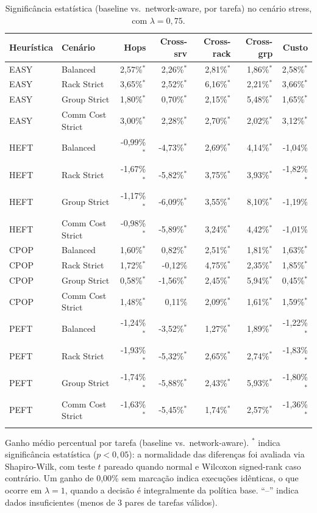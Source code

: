 \begin{table}[htbp]
\centering
\small
\caption{Significância estatística (baseline vs.\ network-aware, por tarefa) no cenário stress, com $\lambda = 0{,}75$.}
\label{tab:significancia_stress_lambda_075}
\begin{tabular}{llrrrrr}
\toprule
Heurística & Cenário & Hops & Cross-srv & Cross-rack & Cross-grp & Custo \\
\midrule
EASY & Balanced & 2,57\%$^{*}$ & 2,26\%$^{*}$ & 2,81\%$^{*}$ & 1,86\%$^{*}$ & 2,58\%$^{*}$ \\
EASY & Rack Strict & 3,65\%$^{*}$ & 2,52\%$^{*}$ & 6,16\%$^{*}$ & 2,21\%$^{*}$ & 3,66\%$^{*}$ \\
EASY & Group Strict & 1,80\%$^{*}$ & 0,70\%$^{*}$ & 2,15\%$^{*}$ & 5,48\%$^{*}$ & 1,65\%$^{*}$ \\
EASY & Comm Cost Strict & 3,00\%$^{*}$ & 2,28\%$^{*}$ & 2,70\%$^{*}$ & 2,02\%$^{*}$ & 3,12\%$^{*}$ \\
\addlinespace
HEFT & Balanced & -0,99\%$^{*}$ & -4,73\%$^{*}$ & 2,69\%$^{*}$ & 4,14\%$^{*}$ & -1,04\% \\
HEFT & Rack Strict & -1,67\%$^{*}$ & -5,82\%$^{*}$ & 3,75\%$^{*}$ & 3,93\%$^{*}$ & -1,82\%$^{*}$ \\
HEFT & Group Strict & -1,17\%$^{*}$ & -6,09\%$^{*}$ & 3,55\%$^{*}$ & 8,10\%$^{*}$ & -1,19\% \\
HEFT & Comm Cost Strict & -0,98\%$^{*}$ & -5,89\%$^{*}$ & 3,24\%$^{*}$ & 4,42\%$^{*}$ & -1,01\% \\
\addlinespace
CPOP & Balanced & 1,60\%$^{*}$ & 0,82\%$^{*}$ & 2,51\%$^{*}$ & 1,81\%$^{*}$ & 1,63\%$^{*}$ \\
CPOP & Rack Strict & 1,72\%$^{*}$ & -0,12\% & 4,75\%$^{*}$ & 2,35\%$^{*}$ & 1,85\%$^{*}$ \\
CPOP & Group Strict & 0,58\%$^{*}$ & -1,56\%$^{*}$ & 2,45\%$^{*}$ & 5,94\%$^{*}$ & 0,45\%$^{*}$ \\
CPOP & Comm Cost Strict & 1,48\%$^{*}$ & 0,11\% & 2,09\%$^{*}$ & 1,61\%$^{*}$ & 1,59\%$^{*}$ \\
\addlinespace
PEFT & Balanced & -1,24\%$^{*}$ & -3,52\%$^{*}$ & 1,27\%$^{*}$ & 1,89\%$^{*}$ & -1,22\%$^{*}$ \\
PEFT & Rack Strict & -1,93\%$^{*}$ & -5,32\%$^{*}$ & 2,65\%$^{*}$ & 2,74\%$^{*}$ & -1,83\%$^{*}$ \\
PEFT & Group Strict & -1,74\%$^{*}$ & -5,88\%$^{*}$ & 2,43\%$^{*}$ & 5,93\%$^{*}$ & -1,80\%$^{*}$ \\
PEFT & Comm Cost Strict & -1,63\%$^{*}$ & -5,45\%$^{*}$ & 1,74\%$^{*}$ & 2,57\%$^{*}$ & -1,36\%$^{*}$ \\
\addlinespace
\bottomrule
\end{tabular}

\vspace{2mm}
\footnotesize Ganho médio percentual por tarefa (baseline vs.\ network-aware). $^{*}$ indica significância estatística ($p<0{,}05$): a normalidade das diferenças foi avaliada via Shapiro-Wilk, com teste $t$ pareado quando normal e Wilcoxon signed-rank caso contrário. Um ganho de 0,00\% sem marcação indica execuções idênticas, o que ocorre em $\lambda = 1$, quando a decisão é integralmente da política base. ``--'' indica dados insuficientes (menos de 3 pares de tarefas válidos).
\end{table}

